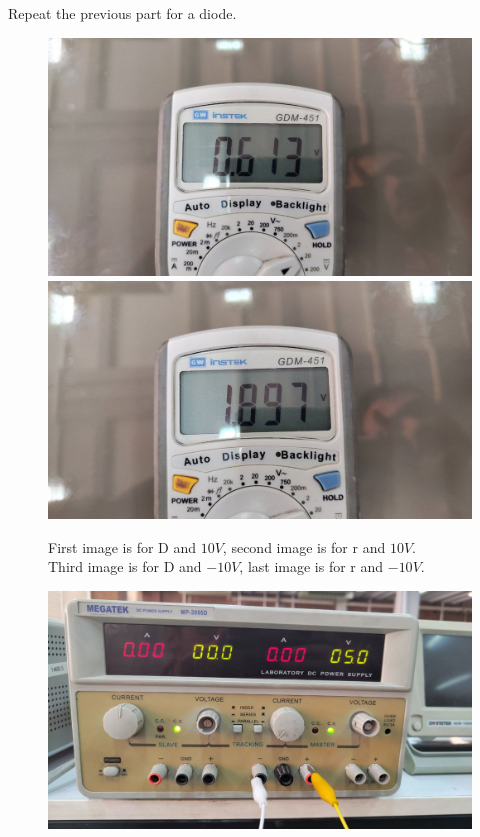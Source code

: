\documentclass[11pt]{article}
\newcommand{\PicScale}{0.2}
\begin{document}
\begin{question}
\begin{subquestion}{Repeat the previous part for a diode.}
{\begin{figure}[H]
                \includegraphics[scale=0.08,angle=0]{Fig/28.jpeg}
                \includegraphics[scale=0.08,angle=0]{Fig/29.jpeg}
                \caption{First image is for D and $10V$, second image is for r and $10V$. \\
                \hspace*{14mm} Third image is for D and $-10V$, last image is for r and $-10V$.}
            \end{figure}
            \begin{figure}[H]
                \centering
                \includegraphics[scale=\PicScale,angle=0]{Fig/30.jpeg}

\end{figure}}
\end{subquestion}
\end{question}
\end{document}
